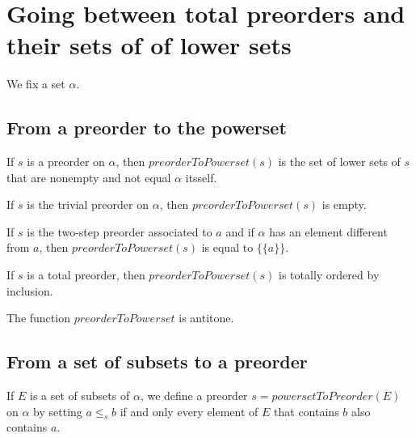 \section{Going between total preorders and their sets of of lower sets}

We fix a set $\alpha$.

\subsection{From a preorder to the powerset}

\begin{subdefi}[preorderToPowerset]
If $s$ is a preorder on $\alpha$, then $preorderToPowerset(s)$ is the set of lower sets of $s$ that are nonempty and
not equal $\alpha$ itsself.

\end{subdefi}

\begin{sublemma}
If $s$ is the trivial preorder on $\alpha$, then $preorderToPowerset(s)$ is empty.

\end{sublemma}

\begin{sublemma}
If $s$ is the two-step preorder associated to $a$ and if $\alpha$ has an element different from $a$, then
$preorderToPowerset(s)$ is equal to $\{\{a\}\}$.

\end{sublemma}

\begin{sublemma}
If $s$ is a total preorder, then $preorderToPowerset(s)$ is totally ordered by inclusion.

\end{sublemma}

\begin{sublemma}
The function $preorderToPowerset$ is antitone.

\end{sublemma}


\subsection{From a set of subsets to a preorder}

\begin{subdefi}[powersetToPreorder]
If $E$ is a set of subsets of $\alpha$, we define a preorder $s=powersetToPreorder(E)$ on $\alpha$ by
setting $a\le_s b$ if and only every element of $E$ that contains $b$ also contains $a$.

\end{subdefi}

